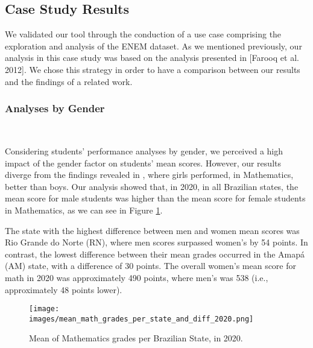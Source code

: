 \documentclass[12pt]{article}
\begin{document}




\subsection{Case Study Results}


We validated our tool through the conduction of a use case comprising the exploration and analysis of the ENEM dataset. As we mentioned previously, our analysis in this case study was based on the analysis presented in [Farooq et al. 2012]. We chose this strategy in order to have a comparison between our results and the findings of a related work.

\subsubsection{Analyses by Gender}\

Considering students' performance analyses by gender, we perceived a high impact of the gender factor on students' mean scores. However, our results diverge from the findings revealed in \cite{Farooq2012FACTORSAS}, where girls performed, in Mathematics, better than boys. Our analysis showed that, in 2020, in all Brazilian states, the mean score for male students was higher than the mean score for female students in Mathematics, as we can see in Figure \ref{gender}. 

The state with the highest difference between men and women mean scores was Rio Grande do Norte (RN), where men scores surpassed women's by 54 points. In contrast, the lowest difference between their mean grades occurred in the Amapá (AM) state, with a difference of 30 points. The overall women's mean score for math in 2020 was approximately 490 points, where men's was 538 (i.e., approximately 48 points lower). 

\begin{figure}[h!]
\centerline{\texttt{[image: images/mean\_math\_grades\_per\_state\_and\_diff\_2020.png]}}
\caption{Mean of Mathematics grades per Brazilian State, in 2020.} 
\label{gender}
\end{figure}
\end{document}
